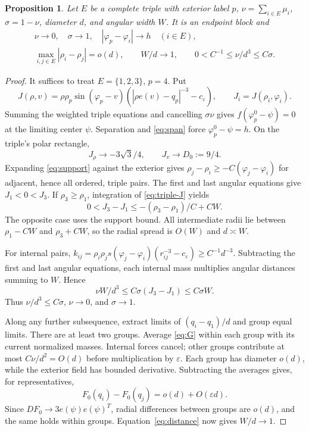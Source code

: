 \documentclass[11pt,a4paper]{article}
\numberwithin{equation}{section}
\newtheorem{proposition}[theorem]{Proposition}
\theoremstyle{remark}
\newcommand{\eps}{\varepsilon}
\begin{document}
\begin{proposition}\label{prop:triple-scale}
Let $E$ be a complete triple with exterior label $p$, $\nu=\sum_{i\in E}\mu_i$, $\sigma=1-\nu$, diameter $d$, and angular width $W$. It is an endpoint block and
\begin{equation}\label{eq:triple-scale}
 \begin{gathered}
 \nu\to0,\quad\sigma\to1,\quad|\varphi_p-\varphi_i|\to h\quad(i\in E),\\
 \max_{i,j\in E}|\rho_i-\rho_j|=o(d),\qquad W/d\to1,\qquad
 0<C^{-1}\le\nu/d^3\le C\sigma.
 \end{gathered}
\end{equation}
\end{proposition}
\begin{proof}
It suffices to treat $E=\{1,2,3\}$, $p=4$. Put
\[
 J(\rho,v)=\rho\rho_p\sin(\varphi_p-v)(|\rho e(v)-q_p|^{-3}-c_\eps),\qquad
 J_i=J(\rho_i,\varphi_i).
\]
Summing the weighted triple equations and cancelling $\sigma\nu$ gives $f(\varphi_p^0-\psi)=0$ at the limiting center $\psi$. Separation and \eqref{eq:span} force $\varphi_p^0-\psi=h$. On the triple's polar rectangle,
\begin{equation}\label{eq:triple-J}
 J_\rho\to-3\sqrt3/4,\qquad J_v\to D_0:=9/4.
\end{equation}
Expanding \eqref{eq:support} against the exterior gives $\rho_j-\rho_i\ge-C(\varphi_j-\varphi_i)$ for adjacent, hence all ordered, triple pairs. The first and last angular equations give $J_1<0<J_3$. If $\rho_3\ge\rho_1$, integration of \eqref{eq:triple-J} yields
\[
 0<J_3-J_1\le-(\rho_3-\rho_1)/C+CW.
\]
The opposite case uses the support bound. All intermediate radii lie between $\rho_1-CW$ and $\rho_3+CW$, so the radial spread is $O(W)$ and $d\asymp W$.

For internal pairs, $k_{ij}=\rho_i\rho_j s(\varphi_j-\varphi_i)(r_{ij}^{-3}-c_\eps)\ge C^{-1}d^{-3}$. Subtracting the first and last angular equations, each internal mass multiplies angular distances summing to $W$. Hence
\[
 \nu W/d^3\le C\sigma(J_3-J_1)\le C\sigma W.
\]
Thus $\nu/d^3\le C\sigma$, $\nu\to0$, and $\sigma\to1$.

Along any further subsequence, extract limits of $(q_i-q_1)/d$ and group equal limits. There are at least two groups. Average \eqref{eq:G} within each group with its current normalized masses. Internal forces cancel; other groups contribute at most $C\nu/d^2=O(d)$ before multiplication by $\eps$. Each group has diameter $o(d)$, while the exterior field has bounded derivative. Subtracting the averages gives, for representatives,
\[
 F_0(q_i)-F_0(q_j)=o(d)+O(\eps d).
\]
Since $DF_0\to3e(\psi)e(\psi)^T$, radial differences between groups are $o(d)$, and the same holds within groups. Equation~\eqref{eq:distance} now gives $W/d\to1$.


\end{proof}
\end{document}
